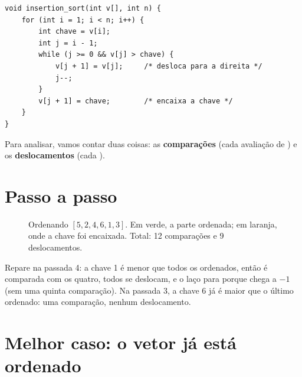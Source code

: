 \begin{lstlisting}[style=c]
void insertion_sort(int v[], int n) {
    for (int i = 1; i < n; i++) {
        int chave = v[i];
        int j = i - 1;
        while (j >= 0 && v[j] > chave) {
            v[j + 1] = v[j];     /* desloca para a direita */
            j--;
        }
        v[j + 1] = chave;        /* encaixa a chave */
    }
}
\end{lstlisting}

Para analisar, vamos contar duas coisas: as \textbf{comparações} (cada avaliação de
) e os \textbf{deslocamentos} (cada ).

\section{Passo a passo}

\begin{figure}[!htb]
\centering
{}
\caption{Ordenando $[5, 2, 4, 6, 1, 3]$. Em verde, a parte ordenada; em laranja, onde a chave foi
encaixada. Total: 12 comparações e 9 deslocamentos.}
\end{figure}

Repare na passada 4: a chave 1 é menor que todos os ordenados, então é comparada com os quatro,
todos se deslocam, e o laço para porque  chega a $-1$ (sem uma quinta comparação). Na
passada 3, a chave 6 já é maior que o último ordenado: uma comparação, nenhum deslocamento.

\section{Melhor caso: o vetor já está ordenado}

